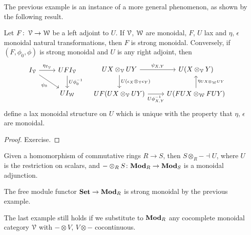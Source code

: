 \documentclass[a4paper,11pt,oneside,openany]{scrbook}
\begin{document}
The previous example is an instance of a more general phenomenon, as shown by the following result.

\begin{thm}
	Let $F\colon\operatorname{\mathcal{V}}\rightarrow\operatorname{\mathcal{W}}$ be a left adjoint to $U$. If $\operatorname{\mathcal{V}}$, $\operatorname{\mathcal{W}}$ are monoidal, $F$, $U$ lax and $\eta$, $\epsilon$ monoidal natural transformations, then $F$ is strong monoidal. Conversely, if $(F,\phi_0,\phi)$ is strong monoidal and $U$ is any right adjoint, then
	\[
		\begin{tikzcd}
			I_{\V}\ar[r, "\eta_{I_{\V}}"]\ar[dr, "\psi_0", swap]
			& UFI_{\V}\ar[d, "U\phi_0^{-1}"] \\
			& UI_{\W}
		\end{tikzcd}
		\quad
		\begin{tikzcd}
			UX\otimes_{\V}UY\ar[r, "\psi_{X,Y}"]\ar[d, "U(\epsilon_X\otimes_{\V}\epsilon_Y)"]
			& U(X\otimes_{\V}Y) \\
			UF(UX\otimes_{\V}UY)\ar[r, "U\phi^{-1}_{X,Y}", swap]
			& U(FUX\otimes_{\W}FUY)\ar[u, "\eta_{UX\otimes_{\W}UY}", swap]
		\end{tikzcd}
	\]
	define a lax monoidal structure on $U$ which is unique with the property that $\eta$, $\epsilon$ are monoidal.
\end{thm}

\begin{proof}
	Exercise.
\end{proof}

\begin{exmp}
	Given a homomorphism of commutative rings $R\rightarrow S$, then $S\otimes_R-\dashv U$, where $U$ is the restriction on scalars, and $-\otimes_RS\colon{\normalfont\textbf{Mod}}_R\rightarrow{\normalfont\textbf{Mod}}_S$ is a monoidal adjunction.

	The free module functor ${\normalfont\textbf{Set}}\rightarrow{\normalfont\textbf{Mod}}_R$ is strong monoidal by the previous example.
\end{exmp}

\begin{rmk}
	The last example still holds if we substitute to ${\normalfont\textbf{Mod}}_R$ any cocomplete monoidal category $\operatorname{\mathcal{V}}$ with $-\otimes V$, $V\otimes -$ cocontinuous.
\end{rmk}
\end{document}

